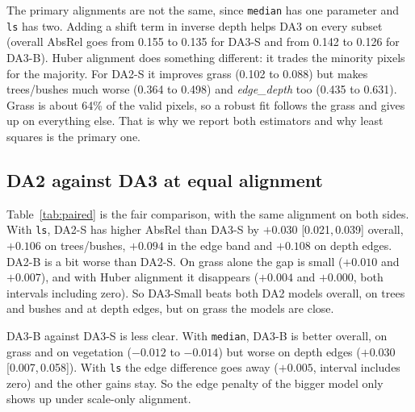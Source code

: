 \documentclass[conference]{IEEEtran}
\newcommand{\ci}[2]{{\scriptsize[#1,\,#2]}}
\newcommand{\absrel}{AbsRel}
\begin{document}
The primary alignments are not the same, since \texttt{median} has one parameter and \texttt{ls} has two. Adding a shift term in inverse depth helps DA3 on every subset (overall \absrel{} goes from 0.155 to 0.135 for DA3-S and from 0.142 to 0.126 for DA3-B). Huber alignment does something different: it trades the minority pixels for the majority. For DA2-S it improves grass (0.102 to 0.088) but makes trees/bushes much worse (0.364 to 0.498) and \emph{edge\_depth} too (0.435 to 0.631). Grass is about 64\% of the valid pixels, so a robust fit follows the grass and gives up on everything else. That is why we report both estimators and why least squares is the primary one.

\subsection{DA2 against DA3 at equal alignment}\label{sec:paired}
Table~\ref{tab:paired} is the fair comparison, with the same alignment on both sides. With \texttt{ls}, DA2-S has higher \absrel{} than DA3-S by $+0.030$ \ci{0.021}{0.039} overall, $+0.106$ on trees/bushes, $+0.094$ in the edge band and $+0.108$ on depth edges. DA2-B is a bit worse than DA2-S. On grass alone the gap is small ($+0.010$ and $+0.007$), and with Huber alignment it disappears ($+0.004$ and $+0.000$, both intervals including zero). So DA3-Small beats both DA2 models overall, on trees and bushes and at depth edges, but on grass the models are close.

DA3-B against DA3-S is less clear. With \texttt{median}, DA3-B is better overall, on grass and on vegetation ($-0.012$ to $-0.014$) but worse on depth edges ($+0.030$ \ci{0.007}{0.058}). With \texttt{ls} the edge difference goes away ($+0.005$, interval includes zero) and the other gains stay. So the edge penalty of the bigger model only shows up under scale-only alignment.
\end{document}
